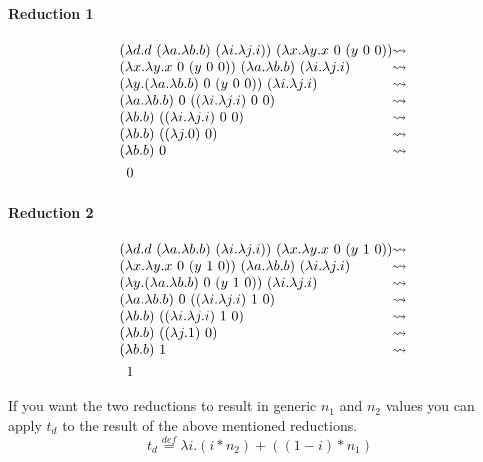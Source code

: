 \documentclass{article}
\newcommand{\lam}[2]{\ensuremath{\lambda#1.#2}}
\begin{document}
\paragraph{Reduction 1}
\begin{align*}
    &\begin{array}{l @{\leadsto} c l}
        (\lam{d}{d\ (\lam{a}\lam{b}{b})\ (\lam{i}\lam{j}{i})})\ (\lam{x}\lam{y}{x\ 0\ (y\ 0\ 0)}) \\
        (\lam{x}\lam{y}{x\ 0\ (y\ 0\ 0)})\ (\lam{a}\lam{b}{b})\ (\lam{i}\lam{j}{i}) \\
        (\lam{y}{(\lam{a}\lam{b}{b})\ 0\ (y\ 0\ 0)})\ (\lam{i}\lam{j}{i}) \\
        (\lam{a}\lam{b}{b})\ 0\ ((\lam{i}\lam{j}{i})\ 0\ 0)\  \\
        (\lam{b}{b})\ ((\lam{i}\lam{j}{i})\ 0\ 0)\  \\
        (\lam{b}{b})\ ((\lam{j}{0})\ 0)\  \\
        (\lam{b}{b})\ 0 \\
    \end{array}\\
    &\quad 0
\end{align*}

\paragraph{Reduction 2}
\begin{align*}
    &\begin{array}{l @{\leadsto} c l}
        (\lam{d}{d\ (\lam{a}\lam{b}{b})\ (\lam{i}\lam{j}{i})})\ (\lam{x}\lam{y}{x\ 0\ (y\ 1\ 0)}) \\
        (\lam{x}\lam{y}{x\ 0\ (y\ 1\ 0)})\ (\lam{a}\lam{b}{b})\ (\lam{i}\lam{j}{i}) \\
        (\lam{y}{(\lam{a}\lam{b}{b})\ 0\ (y\ 1\ 0)})\ (\lam{i}\lam{j}{i}) \\
        (\lam{a}\lam{b}{b})\ 0\ ((\lam{i}\lam{j}{i})\ 1\ 0)\  \\
        (\lam{b}{b})\ ((\lam{i}\lam{j}{i})\ 1\ 0)\  \\
        (\lam{b}{b})\ ((\lam{j}{1})\ 0)\  \\
        (\lam{b}{b})\ 1 \\
    \end{array}\\
    &\quad 1
\end{align*}

If you want the two reductions to result in generic $n_1$ and $n_2$ values you can apply $t_d$ to the result of the above mentioned reductions.
\begin{equation*}
    t_d \overset{def}{=} \lam{i}{(i*n_2)+((1-i)*n_1)}
\end{equation*}
\end{document}
